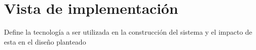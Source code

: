 \chapter{Vista de implementación}

Define la tecnología a ser utilizada en la construcción del sistema y el impacto de esta en el diseño planteado